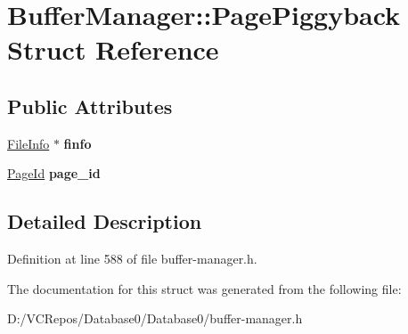 \hypertarget{struct_buffer_manager_1_1_page_piggyback}{}\section{Buffer\+Manager\+::Page\+Piggyback Struct Reference}
\label{struct_buffer_manager_1_1_page_piggyback}
\subsection*{Public Attributes}
\begin{DoxyCompactItemize}
\item 
\mbox{\label{struct_buffer_manager_1_1_page_piggyback_a427ec11c71658ac060d17160f91f8f67}} 
\mbox{\hyperlink{struct_buffer_manager_1_1_file_info}{File\+Info}} $\ast$ {\bfseries finfo}
\item 
\mbox{\label{struct_buffer_manager_1_1_page_piggyback_a83c91fd454a9a8ad4eb8921aa674cc6d}} 
\mbox{\hyperlink{struct_generic_i_o_id}{Page\+Id}} {\bfseries page\+\_\+id}
\end{DoxyCompactItemize}


\subsection{Detailed Description}


Definition at line 588 of file buffer-\/manager.\+h.



The documentation for this struct was generated from the following file\+:\begin{DoxyCompactItemize}
\item 
D\+:/\+V\+C\+Repos/\+Database0/\+Database0/buffer-\/manager.\+h\end{DoxyCompactItemize}
